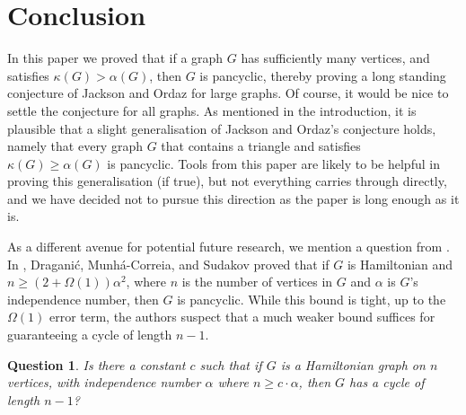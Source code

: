 \documentclass[11pt,english]{article}
\theoremstyle{plain}
\newtheorem{question}[theorem]{Question}
\theoremstyle{definition}
\theoremstyle{remark}
\begin{document}
\section{Conclusion} \label{sec:conc}

	In this paper we proved that if a graph $G$ has sufficiently many vertices, and satisfies $\kappa(G) > \alpha(G)$, then $G$ is pancyclic, thereby proving a long standing conjecture of Jackson and Ordaz \cite{jackson1990chvatal} for large graphs.
	Of course, it would be nice to settle the conjecture for all graphs. As mentioned in the introduction, it is plausible that a slight generalisation of Jackson and Ordaz's conjecture holds, namely that every graph $G$ that contains a triangle and satisfies $\kappa(G) \ge \alpha(G)$ is pancyclic. Tools from this paper are likely to be helpful in proving this generalisation (if true), but not everything carries through directly, and we have decided not to pursue this direction as the paper is long enough as it is. 

	As a different avenue for potential future research, we mention a question from \cite{draganic2022pancyclicity}. In \cite{draganic2022pancyclicity}, Dragani\'c, Munh\'a-Correia, and Sudakov proved that if $G$ is Hamiltonian and $n \ge (2+\Omega(1))\alpha^2$, where $n$ is the number of vertices in $G$ and $\alpha$ is $G$'s independence number, then $G$ is pancyclic. While this bound is tight, up to the $\Omega(1)$ error term, the authors suspect that a much weaker bound suffices for guaranteeing a cycle of length $n-1$.

	\begin{question}
		Is there a constant $c$ such that if $G$ is a Hamiltonian graph on $n$ vertices, with independence number $\alpha$ where $n \ge c \cdot \alpha$, then $G$ has a cycle of length $n-1$?
	\end{question}





\appendix
\end{document}
